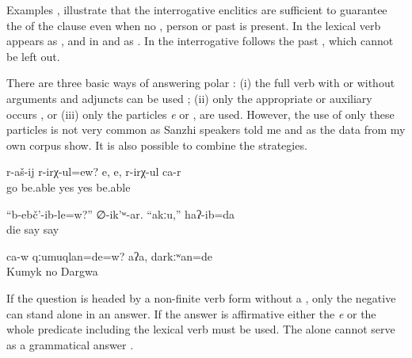 Examples ,  illustrate that the interrogative enclitics are sufficient to guarantee the  of the clause even when no , person  or past  is present. In  the lexical verb appears as , and in  and  as . In  the interrogative  follows the past , which cannot be left out. 

There are three basic ways of answering polar : (i) the full verb with or without arguments and adjuncts can be used ; (ii) only the appropriate  or auxiliary occurs , or (iii) only the particles \textit{e}  or ,   are used. However, the use of only these particles is not very common as Sanzhi speakers told me and as the data from my own corpus show. It is also possible to combine the strategies.

\begin{exe}

	\ex	\label{ex:‎Is she able to walk}
	\gll	r-aš-ij	r-irχ-ul=ew? e,	e,	r-irχ-ul	ca-r\\
		go	be.able yes	yes	be.able	\\
	\glt	{}

	\ex	\label{ex:Did (the cow) die? he asked. No, I said}
	\gll	``b-ebč'-ib-le=w?'' ∅-ik'ʷ-ar.	``akːu,''	haʔ-ib=da\\
		die	say  say\\
	\glt	{}
	
	\ex	\label{ex:Was he himself Kumyk? No, Dargi}
	\gll	ca-w	qːumuqlan=de=w?	aʔa,	darkːʷan=de\\
			Kumyk 	no	Dargwa\\
	\glt	{}
\end{exe}

If the question is headed by a non-finite verb form without a , only the negative  can stand alone in an answer. If the answer is affirmative either the  \textit{e}  or the whole predicate including the lexical verb must be used. The  alone cannot serve as a grammatical answer .

